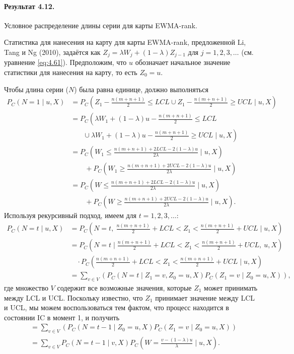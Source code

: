 \paragraph{Результат 4.12.} Условное распределение длины серии для карты EWMA-rank.

Статистика для нанесения на карту для карты EWMA-rank, предложенной Li, Tang и Ng (2010), задаётся как \(Z_j = \lambda W_j + (1 - \lambda)Z_{j-1}\) для \(j = 1, 2, 3, \ldots\) (см. уравнение \eqref{eq:4.61}). Предположим, что \(u\) обозначает начальное значение статистики для нанесения на карту, то есть \(Z_0 = u\).

Чтобы длина серии (\(N\)) была равна единице, должно выполняться
\begin{align*}
	P_C\left( N = 1 \mid u, X \right)
	&= P_C\left( Z_1 - \frac{n(m + n + 1)}{2} \le LCL \cup Z_1 - \frac{n(m + n + 1)}{2} \ge UCL \mid u, X \right) \\
	&= P_C\left( \lambda W_1 + (1 - \lambda)u - \frac{n(m + n + 1)}{2} \le LCL \right. \\
	&\qquad \left. \cup\ \lambda W_1 + (1 - \lambda)u - \frac{n(m + n + 1)}{2} \ge UCL \mid u, X \right) \\
	&= P_C\left( W_1 \le \frac{n(m + n + 1) + 2LCL - 2(1 - \lambda)u}{2\lambda} \mid u, X \right) \\
	&\qquad + P_C\left( W_1 \ge \frac{n(m + n + 1) + 2UCL - 2(1 - \lambda)u}{2\lambda} \mid u, X \right) \\
	&= P_C\left( W \le \frac{n(m + n + 1) + 2LCL - 2(1 - \lambda)u}{2\lambda} \mid u, X \right) \\
	&\qquad + P_C\left( W \ge \frac{n(m + n + 1) + 2UCL - 2(1 - \lambda)u}{2\lambda} \mid u, X \right).
\end{align*}
Используя рекурсивный подход, имеем для \(t = 1, 2, 3, \ldots\):
\begin{align*}
	P_C\left( N = t \mid u, X \right)
	&= P_C\left( N = t,\ \frac{n(m + n + 1)}{2} + LCL < Z_1 < \frac{n(m + n + 1)}{2} + UCL \mid u, X \right) \\
	&= P_C\left( N = t \mid \frac{n(m + n + 1)}{2} + LCL < Z_1 < \frac{n(m + n + 1)}{2} + UCL,\ u, X \right) \\
	&\quad \cdot P_C\left( \frac{n(m + n + 1)}{2} + LCL < Z_1 < \frac{n(m + n + 1)}{2} + UCL \mid u, X \right) \\
	&= \sum_{v \in V}\left( P_C\left( N = t \mid Z_1 = v, Z_0 = u, X \right) P_C\left( Z_1 = v \mid Z_0 = u, X \right) \right),
\end{align*}
где множество \(V\) содержит все возможные значения, которые \(Z_1\) может принимать между LCL и UCL. Поскольку известно, что \(Z_1\) принимает значение между LCL и UCL, мы можем воспользоваться тем фактом, что процесс находится в состоянии IC в момент 1, и получить
\begin{align*}
	&= \sum_{v \in V}\left( P_C\left( N = t - 1 \mid Z_0 = u, X \right) P_C\left( Z_1 = v \mid Z_0 = u, X \right) \right) \\
	&= \sum_{v \in V} P_C\left( N = t - 1 \mid v, X \right) P_C\left( W = \frac{v - (1 - \lambda)u}{\lambda} \mid u, X \right).
\end{align*}
